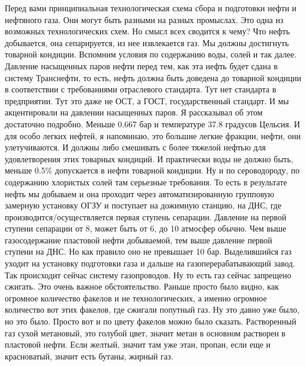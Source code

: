 \documentclass[main.tex]{subfiles}
\begin{document}
Перед вами принципиальная технологическая схема сбора и подготовки нефти и нефтяного газа.
Они могут быть разными на разных промыслах.
Это одна из возможных технологических схем.
Но смысл всех сводится к чему?
Что нефть добывается, она сепарируется, из нее извлекается газ.
Мы должны достигнуть товарной кондиции.
Вспомним условия по содержанию воды, солей и так далее.
Давление насыщенных паров нефти перед тем, как эта нефть будет сдана в систему Транснефти, то есть, нефть должна быть доведена до товарной кондиции в соответствии с требованиями отраслевого стандарта.
Тут нет стандарта в предприятии.
Тут это даже не ОСТ, а ГОСТ, государственный стандарт.
И мы акцентировали на давлении насыщенных паров.
Я рассказывал об этом достаточно подробно.
Меньше 0.667 бар и температуре 37.8 градусов Цельсия.
И для особо легких нефтей, я напоминаю, это большие легкие фракции, нефти, они улетучиваются.
И должны либо смешивать с более тяжелой нефтью для удовлетворения этих товарных кондиций.
И практически воды не должно быть, меньше 0.5\% допускается в нефти товарной кондиции.
Ну и по сероводороду, по содержанию хлористых солей там серьезные требования.
То есть в результате нефть мы добываем и она проходит через автоматизированную групповую замерную установку ОГЗУ и поступает на дожимную станцию, на ДНС, где производится/осуществляется первая ступень сепарации.
Давление на первой ступени сепарации от 8, может быть от 6, до 10 атмосфер обычно.
Чем выше газосодержание пластовой нефти добываемой, тем выше давление первой ступени на ДНС.
Но как правило оно не превышает 10 бар.
Выделившийся газ уходит на установку подготовки газа и дальше на газоперерабатывающий завод.
Так происходит сейчас систему газопроводов.
Ну то есть газ сейчас запрещено сжигать.
Это очень важное обстоятельство.
Раньше просто было видно, как огромное количество факелов и не технологических, а именно огромное количество вот этих факелов, где сжигали попутный газ.
Ну это давно уже было, но это было.
Просто вот и по цвету факелов можно было сказать.
Растворенный газ сухой метановый, это голубой цвет, значит метан в основном растворен в пластовой нефти.
Если желтый, значит там уже этан, пропан, если еще и красноватый, значит есть бутаны, жирный газ.
\end{document}
